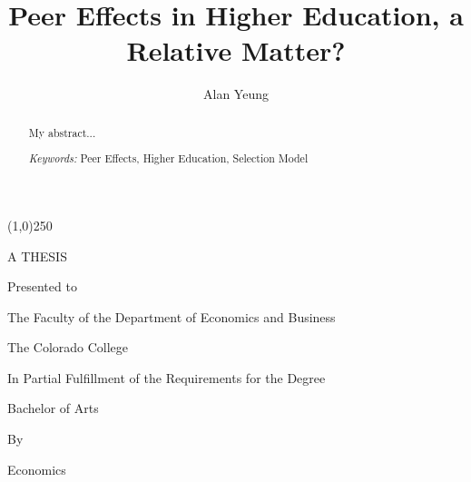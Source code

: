 \title{Peer Effects in Higher Education, a Relative Matter?}

\author{Alan Yeung}

\begin{titlepage}
  \centering
  \vspace*{-.25cm}
  {\Large \thetitle \par}
  \vspace{1.5cm}
  \begin{center}
    \line(1,0){250}
  \end{center}
  \vspace{1.5cm}
  {A THESIS \par}
  \vspace{.25cm}
  {Presented to \par}
  \vspace{.25cm}
  {The Faculty of the Department of Economics and Business \par}
  \vspace{.25cm}
  {The Colorado College \par}
  \vspace{3cm}
  {In Partial Fulfillment of the Requirements for the Degree \par}
  \vspace{.25cm}
  {Bachelor of Arts \par}
  \vspace{.75cm}
  {By \par}
  \vspace{.25cm}
  {\theauthor \par}
  \vspace{.25cm}
  {\thedate \par}
  \vfill
\end{titlepage}

\clearpage{}

\maketitle
\vspace{-1.25cm}
\begin{center}
  \large Economics
\end{center}

\begin{abstract}
  \noindent 
  My abstract...

  \noindent \medskip{}

  \noindent \emph{Keywords: }Peer Effects, Higher Education, Selection Model

\end{abstract}


